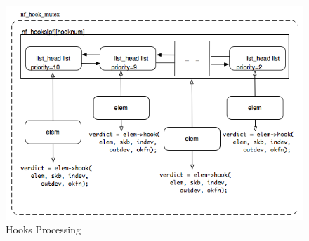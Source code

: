 \documentclass[a4paper,10pt]{article}
\begin{document}
\begin{figure}[H]
  \centering
  \includegraphics[totalheight=0.5\textheight]{images/hook_processing.png}
  \caption{Hooks Processing}\label{fig:hook_processing}
\end{figure}




\end{document}

